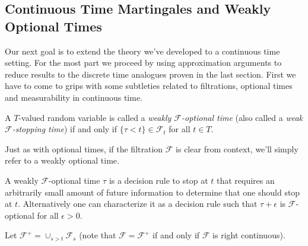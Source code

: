 \subsection {Continuous Time Martingales and Weakly Optional Times}

Our next goal is to extend the theory we've developed to a continuous
time setting.  For the most part we proceed by using approximation
arguments to reduce results to the discrete time analogues proven in
the last section.  First we have to come to grips with some subtleties
related to filtrations, optional times and measurability in continuous
time.

\begin{defn}A $T$-valued random variable is called a
  \emph{weakly $\mathcal{F}$-optional time} (also called a
  \emph{weak $\mathcal{F}$-stopping time}) if and only if $\lbrace \tau <
  t \rbrace \in \mathcal{F}_t$ for all $t \in T$.  
\end{defn}
Just as with optional times, if the filtration $\mathcal{F}$ is clear
from context, we'll simply refer to a weakly optional time.

A weakly $\mathcal{F}$-optional time $\tau$ is a decision rule to stop
at $t$ that requires an arbitrarily small amount of future information
to determine that one should stop at $t$.  Alternatively one can
characterize it as a decision rule such that $\tau + \epsilon$ is
$\mathcal{F}$-optional for all $\epsilon>0$.

Let $\mathcal{F}^+ = \cup_{s>t} \mathcal{F}_s$ (note that $\mathcal{F}
= \mathcal{F}^+$ if and only if $\mathcal{F}$ is right continuous).

